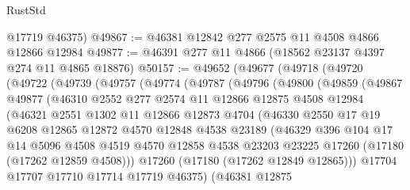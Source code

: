 \begin{lexlean}{RustStd}
\begin{coremodule}
{\begin{coremodule}
{{{{{{{{{{{{{{{{{{{{{{{{{{{{{{{{{{{{{{{{{{{{{{{{{{{{{{{      @17719
      @46375)
@49867 := @46381 @12842 @277 @2575 @11 @4508 @4866 @12866 @12984
@49877 := @46391 @277 @11 @4866 (@18562 @23137 @4397 @274 @11 @4865 @18876)
@50157 := @49652
    (@49677
      (@49718
        (@49720
          (@49722
            (@49739
              (@49757
                (@49774
                  (@49787
                    (@49796
                      (@49800
                        (@49859
                          (@49867
                            @49877
                            (@46310
                              @2552
                              @277
                              @2574
                              @11
                              @12866
                              @12875
                              @4508
                              @12984
                              (@46321
                                @2551
                                @1302
                                @11
                                @12866
                                @12873
                                @4704
                                (@46330
                                  @2550
                                  @17
                                  @19
                                  @6208
                                  @12865
                                  @12872
                                  @4570
                                  @12848
                                  @4538
                                  @23189
                                  (@46329
                                    @396
                                    @104
                                    @17
                                    @14
                                    @5096
                                    @4508
                                    @4519
                                    @4570
                                    @12858
                                    @4538
                                    @23203
                                    @23225
                                    @17260
                                    (@17180 (@17262 @12859 @4508)))
                                  @17260
                                  (@17180 (@17262 @12849 @12865)))
                                @17704
                                @17707
                                @17710
                                @17714
                                @17719
                                @46375)
                              (@46381
                                @12875
}}}}}}}}}}}}}}}}}}}}}}}}}}}}}}}}}}}}}}}}}}}}}}}}}}}}}}}
\end{coremodule}}
\end{coremodule}
\end{lexlean}
